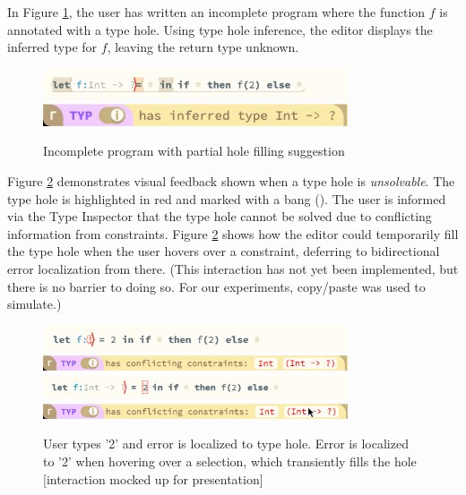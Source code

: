 In Figure \ref{fig:editor_holes}, the user has written an incomplete program where the function $f$ is annotated with a type hole. Using type hole inference, the editor displays the inferred type for $f$, leaving the return type unknown.
\begin{figure}[H]
\includegraphics[width=9cm]{images/example_holes.png}
\includegraphics[width=9cm]{images/example_holes_CI.png}
\caption{Incomplete program with partial hole filling suggestion}
\label{fig:editor_holes}
\end{figure}
Figure \ref{fig:editor_conflict} demonstrates visual feedback shown when a type hole is \textit{unsolvable}. The type hole is highlighted in red and marked with a bang (\li{!}). The user is informed via the Type Inspector that the type hole cannot be solved due to conflicting information from constraints. Figure \ref{fig:editor_conflict} shows how the editor could temporarily fill the type hole when the user hovers over a constraint, deferring to bidirectional error localization from there. (This interaction has not yet been implemented, but there is no barrier to doing so. For our experiments, copy/paste was used to simulate.)
\begin{figure}[H]
\includegraphics[width=9cm]{images/example_conflict.png}
\includegraphics[width=9cm]{images/example_conflict_CI.png}
\includegraphics[width=9cm]{images/example_conflict_hover.png}
\includegraphics[width=9cm]{images/example_conflict_hover_CI.png}
\caption{User types '2' and error is localized to type hole. Error is localized to '2' when hovering over a selection, which transiently fills the hole [interaction mocked up for presentation]}
\label{fig:editor_conflict}
\end{figure}
